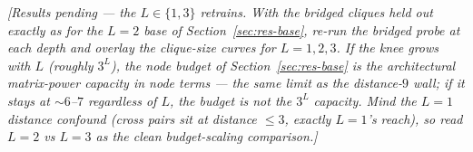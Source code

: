 \documentclass[11pt,a4paper]{article}
\begin{document}
\emph{[Results pending --- the $L\in\{1,3\}$ retrains. With the bridged cliques held out exactly as
for the $L=2$ base of Section~\ref{sec:res-base}, re-run the bridged probe at each depth and overlay
the clique-size curves for $L=1,2,3$. If the knee grows with $L$ (roughly $3^L$), the node budget of
Section~\ref{sec:res-base} is the architectural matrix-power capacity in node terms --- the same
limit as the distance-$9$ wall; if it stays at $\sim6$--$7$ regardless of $L$, the budget is not the
$3^L$ capacity. Mind the $L=1$ distance confound (cross pairs sit at distance $\le3$, exactly $L=1$'s
reach), so read $L=2$ vs $L=3$ as the clean budget-scaling comparison.]}
\end{document}
